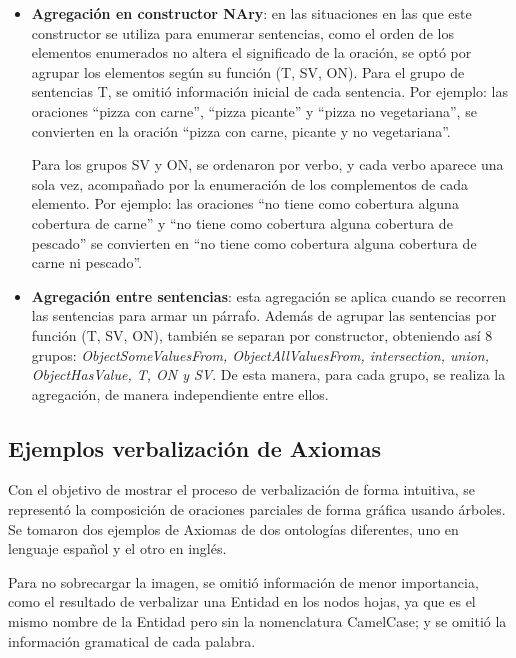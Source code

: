 \begin{itemize}
    \item {\bf Agregación en constructor NAry}: en las situaciones en las que este constructor se utiliza para enumerar sentencias, como el orden de los elementos enumerados no altera el significado de la oración, se optó por agrupar los elementos según su función (T, SV, ON). Para el grupo de sentencias T, se omitió información inicial de cada sentencia. Por ejemplo: las oraciones ``pizza con carne'', ``pizza picante'' y ``pizza no vegetariana'', se convierten en la oración ``pizza con carne, picante y no vegetariana''.
    
    Para los grupos SV y ON, se ordenaron por verbo, y cada verbo aparece una sola vez, acompañado por la enumeración de los complementos de cada elemento. Por ejemplo: las oraciones ``no tiene como cobertura alguna cobertura de carne'' y ``no tiene como cobertura alguna cobertura de pescado'' se convierten en ``no tiene como cobertura alguna cobertura de carne ni pescado''.
    
    \item {\bf Agregación entre sentencias}: esta agregación se aplica cuando se recorren las sentencias para armar un párrafo. Además de agrupar las sentencias por función (T, SV, ON), también se separan por constructor, obteniendo así 8 grupos: \emph{ObjectSomeValuesFrom, ObjectAllValuesFrom, intersection, union, ObjectHasValue, T, ON y SV}. De esta manera, para cada grupo, se realiza la agregación, de manera independiente entre ellos.
\end{itemize}

\subsection{Ejemplos verbalización de Axiomas}
Con el objetivo de mostrar el proceso de verbalización de forma intuitiva, se representó la composición de oraciones parciales de forma gráfica usando árboles. Se tomaron dos ejemplos de Axiomas de dos ontologías diferentes, uno en lenguaje español y el otro en inglés.

Para no sobrecargar la imagen, se omitió información de menor importancia, como el resultado de verbalizar una Entidad en los nodos hojas, ya que es el mismo nombre de la Entidad pero sin la nomenclatura CamelCase; y se omitió la información gramatical de cada palabra.

